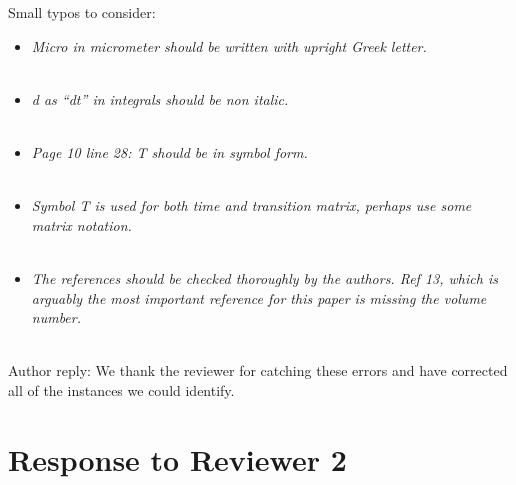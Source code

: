 \documentclass{article}
\begin{document}
\noindent Small typos to consider: \\
\begin{addmargin}[3.3em]{0em}
\begin{itemize}
  \item \textit{Micro in micrometer should be written with upright Greek letter.} \\ \\
  		
  \item \textit{d as “dt” in integrals should be non italic.} \\ \\
  		
  \item \textit{Page 10 line 28: T should be in symbol form.} \\ \\
  		
  \item \textit{Symbol T is used for both time and transition matrix, perhaps use some matrix notation.} \\ \\
  		
  \item \textit{The references should be checked thoroughly by the authors. Ref 13, which is arguably
  the most important reference for this paper is missing the volume number.} \\ \\
\end{itemize}

\end{addmargin}

Author reply: We thank the reviewer for catching these errors and have corrected all of the instances
we could identify.

\section*{Response to Reviewer 2}
\end{document}

